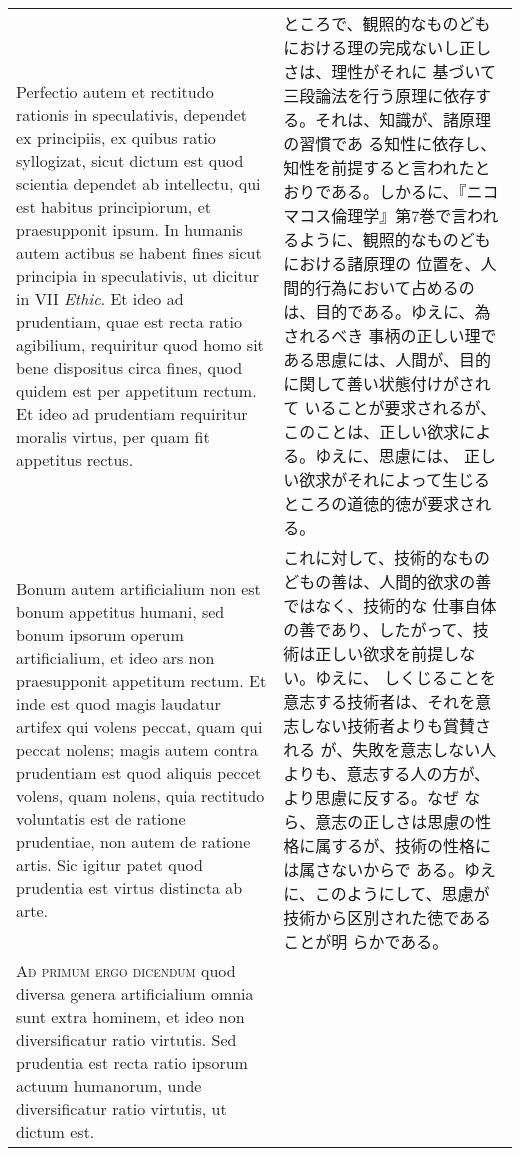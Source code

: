 \documentclass[10pt]{jsarticle}
\begin{document}
\begin{longtable}{p{21em}p{21em}}
\\

Perfectio autem et rectitudo rationis in speculativis, dependet ex
principiis, ex quibus ratio syllogizat, sicut dictum est quod scientia
dependet ab intellectu, qui est habitus principiorum, et praesupponit
ipsum. In humanis autem actibus se habent fines sicut principia in
speculativis, ut dicitur in VII {\itshape Ethic}. Et ideo ad
prudentiam, quae est recta ratio agibilium, requiritur quod homo sit
bene dispositus circa fines, quod quidem est per appetitum rectum. Et
ideo ad prudentiam requiritur moralis virtus, per quam fit appetitus
rectus.

&

ところで、観照的なものどもにおける理の完成ないし正しさは、理性がそれに
基づいて三段論法を行う原理に依存する。それは、知識が、諸原理の習慣であ
る知性に依存し、知性を前提すると言われたとおりである。しかるに、『ニコ
マコス倫理学』第7巻で言われるように、観照的なものどもにおける諸原理の
位置を、人間的行為において占めるのは、目的である。ゆえに、為されるべき
事柄の正しい理である思慮には、人間が、目的に関して善い状態付けがされて
いることが要求されるが、このことは、正しい欲求による。ゆえに、思慮には、
正しい欲求がそれによって生じるところの道徳的徳が要求される。

\\

Bonum autem artificialium non est bonum appetitus humani, sed bonum
ipsorum operum artificialium, et ideo ars non praesupponit appetitum
rectum. Et inde est quod magis laudatur artifex qui volens peccat,
quam qui peccat nolens; magis autem contra prudentiam est quod aliquis
peccet volens, quam nolens, quia rectitudo voluntatis est de ratione
prudentiae, non autem de ratione artis. Sic igitur patet quod
prudentia est virtus distincta ab arte.

&

これに対して、技術的なものどもの善は、人間的欲求の善ではなく、技術的な
仕事自体の善であり、したがって、技術は正しい欲求を前提しない。ゆえに、
しくじることを意志する技術者は、それを意志しない技術者よりも賞賛される
が、失敗を意志しない人よりも、意志する人の方が、より思慮に反する。なぜ
なら、意志の正しさは思慮の性格に属するが、技術の性格には属さないからで
ある。ゆえに、このようにして、思慮が技術から区別された徳であることが明
らかである。

\\

{\scshape Ad primum ergo dicendum} quod diversa genera artificialium
 omnia sunt extra hominem, et ideo non diversificatur ratio
 virtutis. Sed prudentia est recta ratio ipsorum actuum humanorum,
 unde diversificatur ratio virtutis, ut dictum est.


\end{longtable}
\end{document}
